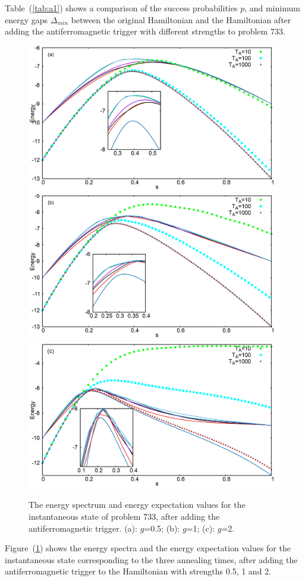 \documentclass[../main.tex]{subfiles}
\begin{document}
Table~(\ref{tab:a1}) shows a comparison of the success probabilities $p$, and minimum energy gaps $\Delta_{min}$ between the original Hamiltonian and the Hamiltonian after adding the antiferromagnetic trigger with different strengths to problem 733.
\begin{figure}
\centering 
\includegraphics[scale=0.24]{733_s12_A_g0.png}
\includegraphics[scale=0.24]{733_s12_A_g1.png}
\includegraphics[scale=0.24]{733_s12_A_g2.png}
\caption{The energy spectrum and energy expectation values for the instantaneous state of problem 733, after adding the antiferromagnetic trigger. (a): $g$=0.5; (b): $g$=1; (c): $g$=2.}
\label{fig:a1}
\end{figure}
Figure~(\ref{fig:a1}) shows the energy spectra and the energy expectation values for the instantaneous state corresponding to the three annealing times, after adding the antiferromagnetic trigger to the Hamiltonian with strengths 0.5, 1 and 2.
\end{document}
